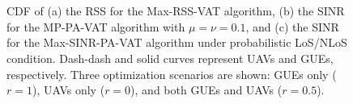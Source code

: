 \begin{figure}[!t]
\centering
{}
\hspace{0mm}\\
\vspace*{3mm}
\hspace{0mm}\\
\vspace*{3mm}
\captionsetup{justification=justified}
\caption{CDF of (a) the RSS for the Max-RSS-VAT algorithm, (b) the SINR for the MP-PA-VAT algorithm with $\mu =\nu = 0.1$, and (c) the SINR for the Max-SINR-PA-VAT algorithm under probabilistic LoS/NLoS condition. Dash-dash and solid curves represent UAVs and GUEs, respectively. Three optimization scenarios are shown: GUEs only ($r=1$), UAVs only ($r=0$), and both GUEs and UAVs ($r=0.5$).}
\label{TWC-CDF-Plots}
\end{figure}

